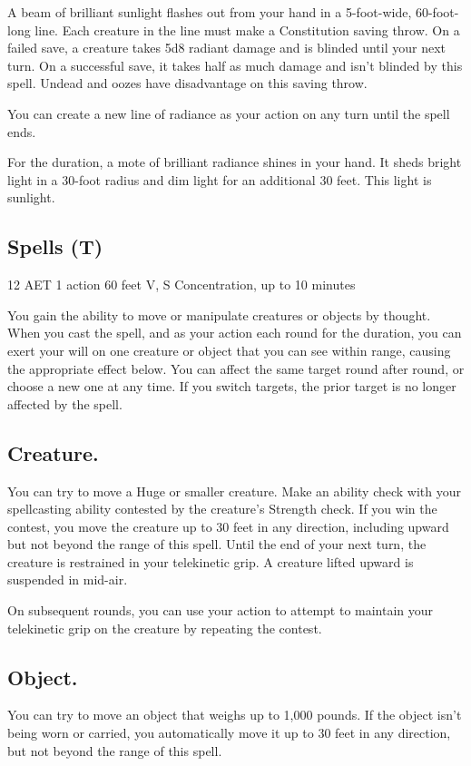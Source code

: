 A beam of brilliant sunlight flashes out from your hand in a 5-foot-wide, 60-foot-long line. Each creature in the line must make a Constitution saving throw. On a failed save, a creature takes 5d8 radiant damage and is blinded until your next turn. On a successful save, it takes half as much damage and isn't blinded by this spell. Undead and oozes have disadvantage on this saving throw.

You can create a new line of radiance as your action on any turn until the spell ends.

For the duration, a mote of brilliant radiance shines in your hand. It sheds bright light in a 30-foot radius and dim light for an additional 30 feet. This light is sunlight.

\subsection{Spells (T)}

\label{spell:telekinesis}
{12 AET}
{1 action}
{60 feet}
{V, S}
{Concentration, up to 10 minutes}

You gain the ability to move or manipulate creatures or objects by thought. When you cast the spell, and as your action each round for the duration, you can exert your will on one creature or object that you can see within range, causing the appropriate effect below. You can affect the same target round after round, or choose a new one at any time. If you switch targets, the prior target is no longer affected by the spell.

\subsection*{Creature.} You can try to move a Huge or smaller creature. Make an ability check with your spellcasting ability contested by the creature's Strength check. If you win the contest, you move the creature up to 30 feet in any direction, including upward but not beyond the range of this spell. Until the end of your next turn, the creature is restrained in your telekinetic grip. A creature lifted upward is suspended in mid-air.

On subsequent rounds, you can use your action to attempt to maintain your telekinetic grip on the creature by repeating the contest.

\subsection*{Object.} You can try to move an object that weighs up to 1,000 pounds. If the object isn't being worn or carried, you automatically move it up to 30 feet in any direction, but not beyond the range of this spell.

